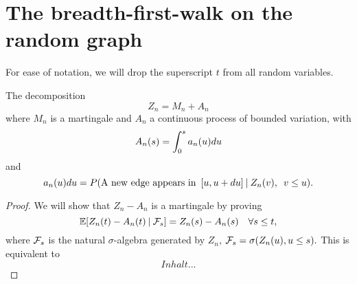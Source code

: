 
\chapter{The breadth-first-walk on the random graph}

For ease of notation, we will drop the superscript $t$ from all random variables.

\begin{lemma}
	The decomposition 
	\begin{equation} \label{decomp Zn}
	Z_n = M_n + A_n
	\end{equation}
	where $M_n$ is a martingale and $A_n$ a continuous process of bounded variation, with
	\begin{equation} \label{def An}
	A_n(s) = \int_{0}^{s} a_n(u)du
	\end{equation}
	and
	\begin{equation} \label{def an}
	a_n(u)du = P(\text{A new edge appears in} \enspace [u, u+du] \: | \: Z_n(v), \enspace v \leq u).
	\end{equation}
\end{lemma}
\begin{proof}
	We will show that
	$Z_n - A_n$
	is a martingale by proving
	\begin{equation} \label{Mn martingale}
		\mathbb{E}[ Z_n(t) - A_n(t) \: | \: \mathcal{F}_{s} ] = Z_n(s) - A_n(s) \quad \forall s \leq t,
	\end{equation}
	where $\mathcal{F}_{s}$ is the natural $\sigma$-algebra generated by $Z_n$, 
	$\mathcal{F}_{s} = \sigma(Z_n(u), u \leq s).$
	This is equivalent to 
	\begin{equation}
	Inhalt...
	\end{equation}
	
\end{proof}



